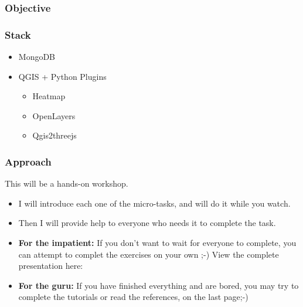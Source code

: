 \documentclass[hyperref={pdfpagelabels=true}]{beamer}
\begin{document}
\begin{frame}
\frametitle{Objective}

\end{frame}

\begin{frame}
\frametitle{Stack}
\begin{itemize}
  \item MongoDB
  \item QGIS + Python Plugins
  \begin{itemize}
    \item<2-> Heatmap
    \item<3-> OpenLayers
    \item<4-> Qgis2threejs    
  \end{itemize}    
\end{itemize}

\end{frame}

\begin{frame}
\frametitle{Approach}
This will be a hands-on workshop.
\begin{itemize}
  \item<2-> I will introduce each one of the micro-tasks, and will do it while you watch.
  \item<3-> Then I will provide help to everyone who needs it to complete the task.
  \item<4-> \textbf{For the impatient:} If you don't want to wait for everyone to complete, you can attempt to complet the exercises on your own ;-) View the complete presentation here: %
  \item<5-> \textbf{For the guru:} If you have finished everything and are bored, you may try to complete the tutorials or read the references, on the last page;-)
\end{itemize}
\end{frame}
\end{document}
